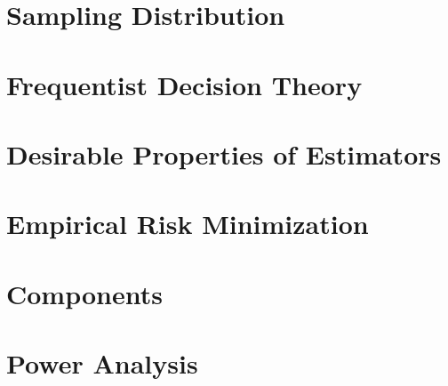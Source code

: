 \section{Sampling Distribution}


\section{Frequentist Decision Theory}


\section{Desirable Properties of Estimators}


\section{Empirical Risk Minimization}


\section{Components}


\section{Power Analysis}

